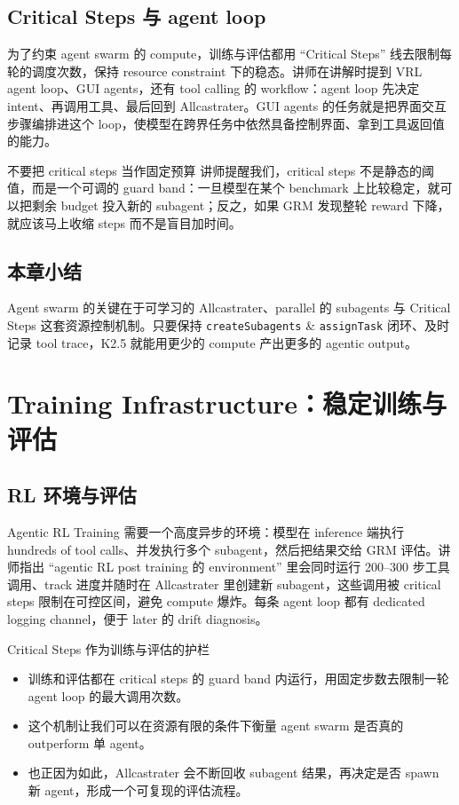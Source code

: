 \documentclass[a4paper]{article}
\begin{document}
\subsection{Critical Steps 与 agent loop}
为了约束 agent swarm 的 compute，训练与评估都用 ``Critical Steps'' 线去限制每轮的调度次数，保持 resource constraint 下的稳态。讲师在讲解时提到 VRL agent loop、GUI agents，还有 tool calling 的 workflow：agent loop 先决定 intent、再调用工具、最后回到 Allcastrater。GUI agents 的任务就是把界面交互步骤编排进这个 loop，使模型在跨界任务中依然具备控制界面、拿到工具返回值的能力。

\begin{warningbox}{不要把 critical steps 当作固定预算}
讲师提醒我们，critical steps 不是静态的阈值，而是一个可调的 guard band：一旦模型在某个 benchmark 上比较稳定，就可以把剩余 budget 投入新的 subagent；反之，如果 GRM 发现整轮 reward 下降，就应该马上收缩 steps 而不是盲目加时间。
\end{warningbox}

\subsection{本章小结}
Agent swarm 的关键在于可学习的 Allcastrater、parallel 的 subagents 与 Critical Steps 这套资源控制机制。只要保持 \texttt{createSubagents} \& \texttt{assignTask} 闭环、及时记录 tool trace，K2.5 就能用更少的 compute 产出更多的 agentic output。
\section{Training Infrastructure：稳定训练与评估}

\subsection{RL 环境与评估}
Agentic RL Training 需要一个高度异步的环境：模型在 inference 端执行 hundreds of tool calls、并发执行多个 subagent，然后把结果交给 GRM 评估。讲师指出 ``agentic RL post training 的 environment'' 里会同时运行 200--300 步工具调用、track 进度并随时在 Allcastrater 里创建新 subagent，这些调用被 critical steps 限制在可控区间，避免 compute 爆炸。每条 agent loop 都有 dedicated logging channel，便于 later 的 drift diagnosis。

\begin{knowledgebox}{Critical Steps 作为训练与评估的护栏}
\begin{itemize}
    \item 训练和评估都在 critical steps 的 guard band 内运行，用固定步数去限制一轮 agent loop 的最大调用次数。
    \item 这个机制让我们可以在资源有限的条件下衡量 agent swarm 是否真的 outperform 单 agent。
    \item 也正因为如此，Allcastrater 会不断回收 subagent 结果，再决定是否 spawn 新 agent，形成一个可复现的评估流程。
\end{itemize}
\end{knowledgebox}
\end{document}
